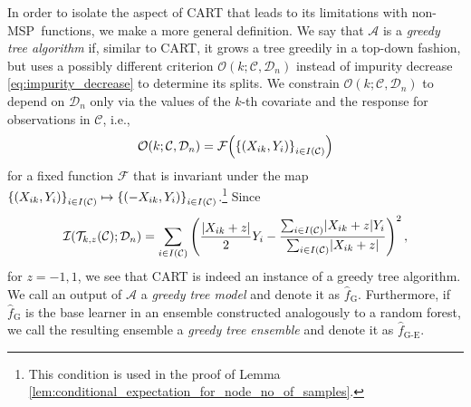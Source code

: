 \documentclass[11pt]{article}
\DeclarePairedDelimiter{\braces}{\lbrace}{\rbrace}
\DeclarePairedDelimiter{\paren}{(}{)}
\DeclarePairedDelimiter{\abs}{|}{|}
\newcommand{\cell}{\mathcal{C}}
\newcommand{\nfeats}{d}
\newcommand{\coordindices}{[\nfeats]}
\newcommand{\data}[1][n]{\mathcal{D}_{#1}}
\newcommand{\cellfeatindices}{J}
\newcommand{\MSP}{\textsf{MSP}}
\newcommand{\splitoperator}{\mathcal{T}}
\newcommand{\cellsampindices}{I}
\newcommand{\fgreedy}{\hat{f}_{\operatorname{G}}}
\newcommand{\alg}{\mathcal{A}}
\newcommand{\splitcriterion}{\mathcal{O}}
\newcommand{\Imp}{\mathcal{I}}
\newcommand{\fgre}{\hat f_{\operatorname{G-E}}}
\begin{document}
In order to isolate the aspect of CART that leads to its limitations with non-\MSP~functions, we make a more general definition.
We say that $\alg$ is a \emph{greedy tree algorithm} if, similar to CART, it grows a tree greedily in a top-down fashion, but uses a possibly different criterion $\splitcriterion(k;\cell,\data)$ instead of impurity decrease \eqref{eq:impurity_decrease} to determine its splits.
We constrain $\splitcriterion(k;\cell,\data)$ to depend on $\data$ only via the values of the $k$-th covariate and the response for observations in $\cell$, i.e.,
\begin{equation}
    \label{eq:greedy_criterion}
    \splitcriterion(k;\cell,\data) = \mathcal{F}\paren*{\braces*{(X_{ik},Y_i)}_{i \in \cellsampindices(\cell)}}
\end{equation}
for a fixed function $\mathcal{F}$ that is invariant under the map $\braces*{(X_{ik},Y_i)}_{i \in \cellsampindices(\cell)} \mapsto \braces*{(-X_{ik},Y_i)}_{i \in \cellsampindices(\cell)}$.\footnote{This condition is used in the proof of Lemma \ref{lem:conditional_expectation_for_node_no_of_samples}.}
Since
\begin{equation}
    \Imp(\splitoperator_{k,z}(\cell);\data) = \sum_{i \in \cellsampindices(\cell)} \left( \frac{\abs{X_{ik} + z}}{2}Y_i - \frac{\sum_{i \in \cellsampindices(\cell) }\abs{X_{ik}+z}Y_i}{\sum_{i \in \cellsampindices(\cell)} \abs{X_{ik} + z}}\right)^2,
\end{equation}
for $z=-1,1$, we see that CART is indeed an instance of a greedy tree algorithm.
We call an output of $\alg$ a \emph{greedy tree model} and denote it as $\fgreedy$.
Furthermore, if $\fgreedy$ is the base learner in an ensemble constructed analogously to a random forest, we call the resulting ensemble a \emph{greedy tree ensemble} and denote it as $\fgre$.

\end{document}
